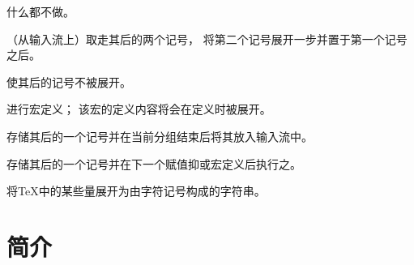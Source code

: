 \documentclass{book}
\begin{document}
\begin{inventory}
\item [\cs{relax}] 
     什么都不做。


\item [\cs{expandafter}]  
      （从输入流上）取走其后的两个记号，
      将第二个记号展开一步并置于第一个记号之后。

\item [\cs{noexpand}]   
      使其后的记号不被展开。


\item [\cs{edef}] 
      进行宏定义；
      该宏的定义内容将会在定义时被展开。
% 
 
\item [\cs{aftergroup}]  
      存储其后的一个记号并在当前分组结束后将其放入输入流中。

\item [\cs{afterassignment}]   
      存储其后的一个记号并在下一个赋值抑或宏定义后执行之。

\item [\cs{the}] 
      将{\TeX}中的某些量展开为由字符记号构成的字符串。

\end{inventory}


\section{简介}
\end{document}
